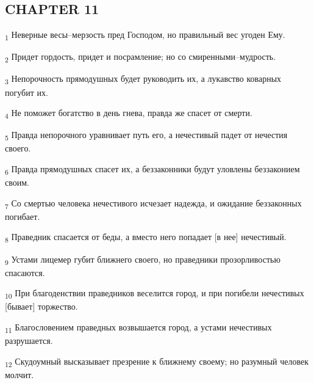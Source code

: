 \subsection{CHAPTER 11}
\begin{tcolorbox}
\textsubscript{1} Неверные весы--мерзость пред Господом, но правильный вес угоден Ему.
\end{tcolorbox}
\begin{tcolorbox}
\textsubscript{2} Придет гордость, придет и посрамление; но со смиренными--мудрость.
\end{tcolorbox}
\begin{tcolorbox}
\textsubscript{3} Непорочность прямодушных будет руководить их, а лукавство коварных погубит их.
\end{tcolorbox}
\begin{tcolorbox}
\textsubscript{4} Не поможет богатство в день гнева, правда же спасет от смерти.
\end{tcolorbox}
\begin{tcolorbox}
\textsubscript{5} Правда непорочного уравнивает путь его, а нечестивый падет от нечестия своего.
\end{tcolorbox}
\begin{tcolorbox}
\textsubscript{6} Правда прямодушных спасет их, а беззаконники будут уловлены беззаконием своим.
\end{tcolorbox}
\begin{tcolorbox}
\textsubscript{7} Со смертью человека нечестивого исчезает надежда, и ожидание беззаконных погибает.
\end{tcolorbox}
\begin{tcolorbox}
\textsubscript{8} Праведник спасается от беды, а вместо него попадает [в нее] нечестивый.
\end{tcolorbox}
\begin{tcolorbox}
\textsubscript{9} Устами лицемер губит ближнего своего, но праведники прозорливостью спасаются.
\end{tcolorbox}
\begin{tcolorbox}
\textsubscript{10} При благоденствии праведников веселится город, и при погибели нечестивых [бывает] торжество.
\end{tcolorbox}
\begin{tcolorbox}
\textsubscript{11} Благословением праведных возвышается город, а устами нечестивых разрушается.
\end{tcolorbox}
\begin{tcolorbox}
\textsubscript{12} Скудоумный высказывает презрение к ближнему своему; но разумный человек молчит.
\end{tcolorbox}
